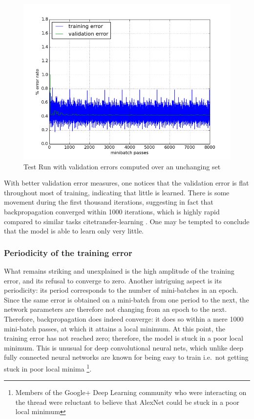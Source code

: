 \documentclass[a4paper,11pt]{article}
\begin{document}
\begin{figure}[h!]
	\centering
	\includegraphics[scale=0.5]{images/increase_test_precision.png}
	\caption{Test Run with validation errors computed over an unchanging set}
    \label{f29}
\end{figure}

With better validation error measures, one notices that the validation error is flat throughout most of training, indicating that little is learned. There is some movement during the first thousand iterations, suggesting in fact that backpropagation converged within 1000 iterations, which is highly rapid compared to similar tasks \cite{decaf} \cite{fergus_tutorial} cite{transfer-learning} \cite{caffe-website}. One may be tempted to conclude that the model is able to learn only very little.


\subsubsection{Periodicity of the training error}

What remains striking and unexplained is the high amplitude of the training error, and its refusal to converge to zero. Another intriguing aspect is its periodicity: its period corresponds to the number of mini-batches in an epoch. Since the same error is obtained on a mini-batch from one period to the next, the network parameters are therefore not changing from an epoch to the next. Therefore, backpropagation does indeed converge: it does so within a mere 1000 mini-batch passes, at which it attains a local minimum. At this point, the training error has not reached zero; therefore, the model is stuck in a poor local minimum. This is unusual for deep convolutional neural nets, which unlike deep fully connected neural networks are known for being easy to train i.e.\ not getting stuck in poor local minima \cite{DL-book}\footnote{Members of the Google+ Deep Learning community who were interacting on the thread were reluctant to believe that AlexNet could be stuck in a poor local minimum}. 
\end{document}
